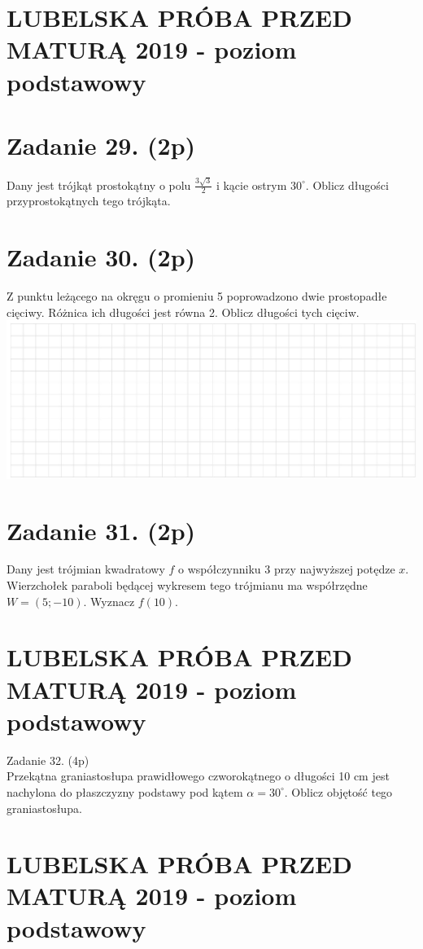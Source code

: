 \documentclass[10pt]{article}
\begin{document}
\section*{LUBELSKA PRÓBA PRZED MATURĄ 2019 - poziom podstawowy}
\section*{Zadanie 29. (2p)}
Dany jest trójkąt prostokątny o polu \(\frac{3 \sqrt{3}}{2}\) i kącie ostrym \(30^{\circ}\). Oblicz długości przyprostokątnych tego trójkąta.

\section*{Zadanie 30. (2p)}
Z punktu leżącego na okręgu o promieniu 5 poprowadzono dwie prostopadłe cięciwy. Różnica ich długości jest równa 2. Oblicz długości tych cięciw.\\
\includegraphics[max width=\textwidth, center]{2024_11_21_90ea54b753259b37713ag-10}

\section*{Zadanie 31. (2p)}
Dany jest trójmian kwadratowy \(f\) o współczynniku 3 przy najwyższej potędze \(x\). Wierzchołek paraboli będącej wykresem tego trójmianu ma współrzędne \(W=(5 ;-10)\). Wyznacz \(f(10)\).

\section*{LUBELSKA PRÓBA PRZED MATURĄ 2019 - poziom podstawowy}
Zadanie 32. (4p)\\
Przekątna graniastosłupa prawidłowego czworokątnego o długości 10 cm jest nachylona do płaszczyzny podstawy pod kątem \(\alpha=30^{\circ}\). Oblicz objętość tego graniastosłupa.

\section*{LUBELSKA PRÓBA PRZED MATURĄ 2019 - poziom podstawowy}
\end{document}
